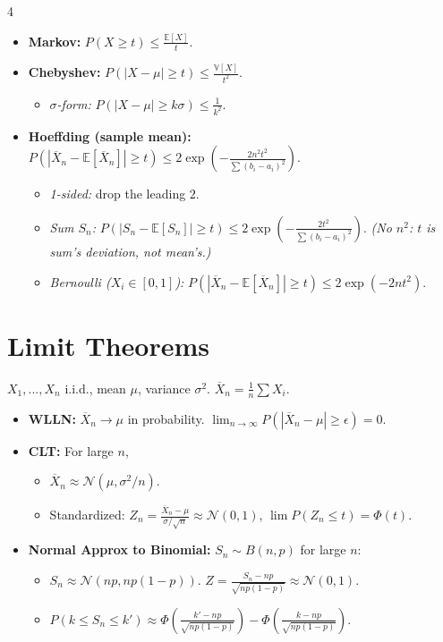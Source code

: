 \documentclass[9pt]{extarticle}
\begin{document}
\begin{multicols*}{4}
\begin{itemize}
    \item \textbf{Markov:} $P(X \ge t) \le \frac{\mathbb{E}[X]}{t}$.
    \item \textbf{Chebyshev:} $P(|X - \mu| \ge t) \le \frac{\mathbb{V}[X]}{t^2}$.
    \begin{itemize}
        \item \textit{$\sigma$-form:} $P(|X - \mu| \ge k\sigma) \le \frac{1}{k^2}$.
    \end{itemize}
    \item \textbf{Hoeffding (sample mean):} $P(|\overline{X}_n - \mathbb{E}[\overline{X}_n]| \ge t) \le 2 \exp\!\left(-\frac{2n^2t^2}{\sum(b_i - a_i)^2}\right)$.
    \begin{itemize}
        \item \textit{1-sided:} drop the leading $2$.
        \item \textit{Sum $S_n$:} $P(|S_n - \mathbb{E}[S_n]| \ge t) \le 2\exp\!\left(-\frac{2t^2}{\sum(b_i - a_i)^2}\right)$. \textit{(No $n^2$: $t$ is sum's deviation, not mean's.)}
        \item \textit{Bernoulli ($X_i \in [0,1]$):} $P(|\overline{X}_n - \mathbb{E}[\overline{X}_n]| \ge t) \le 2 \exp(-2nt^2)$.
    \end{itemize}
\end{itemize}
 
\section*{Limit Theorems}
$X_1, ..., X_n$ i.i.d., mean $\mu$, variance $\sigma^2$. $\overline{X}_n = \frac{1}{n}\sum X_i$.
\begin{itemize}
    \item \textbf{WLLN:} $\overline{X}_n \to \mu$ in probability. $\lim_{n\to\infty}P(|\overline{X}_n - \mu| \ge \epsilon) = 0$.
    \item \textbf{CLT:} For large $n$,
    \begin{itemize}
        \item $\overline{X}_n \approx \mathcal{N}(\mu, \sigma^2/n)$.
        \item Standardized: $Z_n = \frac{\overline{X}_n - \mu}{\sigma/\sqrt{n}} \approx \mathcal{N}(0,1)$, $\lim P(Z_n \le t) = \Phi(t)$.
    \end{itemize}
    \item \textbf{Normal Approx to Binomial:} $S_n \sim B(n,p)$ for large $n$:
    \begin{itemize}
        \item $S_n \approx \mathcal{N}(np, np(1-p))$. \quad $Z = \frac{S_n - np}{\sqrt{np(1-p)}} \approx \mathcal{N}(0,1)$.
        \item $P(k \le S_n \le k') \approx \Phi(\frac{k'-np}{\sqrt{np(1-p)}}) - \Phi(\frac{k-np}{\sqrt{np(1-p)}})$.
    \end{itemize}
\end{itemize}
 

\end{multicols*}
\end{document}

